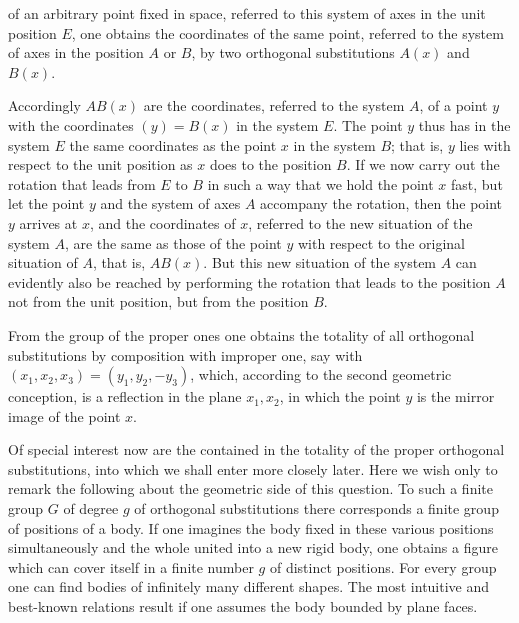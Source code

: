 of an arbitrary point fixed in space, referred to this
system of axes in the unit position $E$, one obtains the coordinates of the same point, referred to the system of axes in the
position $A$ or $B$, by two orthogonal substitutions $A(x)$
and $B(x)$.

Accordingly $AB(x)$ are the coordinates, referred to the
system $A$, of a point $y$ with the coordinates $(y) = B(x)$
in the system $E$. The point $y$ thus has in the system $E$ the same
coordinates as the point $x$ in the system $B$; that is, $y$ lies with respect to the
unit position as $x$ does to the position $B$. If we now carry out the
rotation that leads from $E$ to $B$ in such a way that we hold the point $x$
fast, but let the point $y$ and the system of axes $A$ accompany
the rotation, then the point $y$ arrives at $x$, and the coordinates of $x$, referred to the new situation of the system $A$, are
the same as those of the point $y$ with respect to the original
situation of $A$, that is, $AB(x)$. But this new situation of the system $A$
can evidently also be reached by performing the rotation
that leads to the position $A$ not from the unit position,
but from the position $B$.

From the group of the proper ones one obtains the totality
of all orthogonal substitutions by composition with
 improper one, say with $(x_1, x_2, x_3) = (y_1, y_2, - y_3)$,
which, according to the second geometric conception, is a reflection
in the plane $x_1, x_2$, in which the point $y$ is the mirror image
of the point $x$.

Of special interest now are the  contained in the totality
of the proper orthogonal substitutions, into which we shall enter more closely later.
Here we wish only to remark the following about the geometric side of this
question. To such a finite group $G$
of degree $g$ of orthogonal substitutions there corresponds a
finite group of positions of a body. If one imagines
the body fixed in these various positions simultaneously
and the whole united into a new rigid body, one
obtains a figure which can cover itself in a finite number $g$ of
distinct positions. For every
group one can find bodies of infinitely many different shapes.
The most intuitive and best-known relations result if one assumes the body bounded by plane faces.

